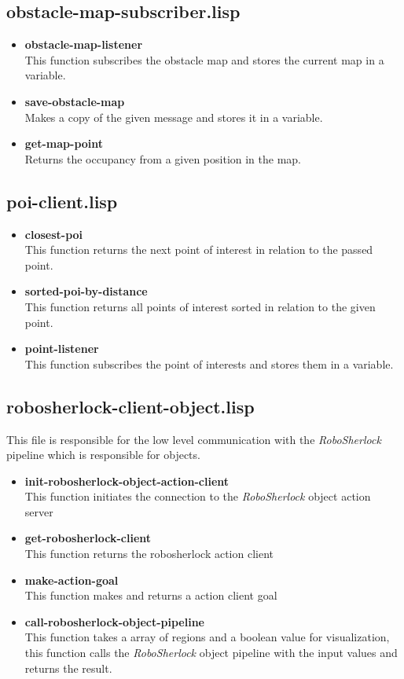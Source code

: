 \documentclass[main.tex]{subfiles}
\begin{document}
		\subsection{obstacle-map-subscriber.lisp}
	    \begin{itemize}
	    	\item \textbf{obstacle-map-listener} \\
	    	This function subscribes the obstacle map and stores the current map in a variable.
	    	\item \textbf{save-obstacle-map} \\
	    	Makes a copy of the given message and stores it in a variable.
	    	\item \textbf{get-map-point} \\
	    	Returns the occupancy from a given position in the map.
	    \end{itemize}
		\subsection{poi-client.lisp}
 		\begin{itemize}
	    	\item \textbf{closest-poi} \\
	    	This function returns the next point of interest in relation to the passed point.
	    	\item \textbf{sorted-poi-by-distance} \\
	    	This function returns all points of interest sorted in relation to the given point.
	    	\item \textbf{point-listener} \\
	    	This function subscribes the point of interests and stores them in a variable.
	    \end{itemize}
		\subsection{robosherlock-client-object.lisp}
		This file is responsible for the low level communication with the \textit{RoboSherlock} pipeline which is responsible for objects.
		\begin{itemize}
			\item \textbf{init-robosherlock-object-action-client} \\
			This function initiates the connection to the \textit{RoboSherlock} object action server
			\item \textbf{get-robosherlock-client} \\
			This function returns the robosherlock action client
			\item \textbf{make-action-goal} \\
			This function makes and returns a action client goal
			\item \textbf{call-robosherlock-object-pipeline} \\
			This function takes a array of regions and a boolean value for visualization, this function calls the \textit{RoboSherlock} object pipeline with the input values and returns the result.
		\end{itemize}
\end{document}
